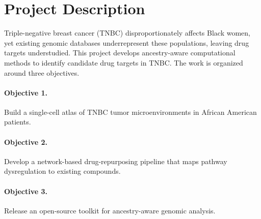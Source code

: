 \documentclass[11pt]{article}
\begin{document}
\section*{Project Description}

Triple-negative breast cancer (TNBC) disproportionately affects Black women, yet
existing genomic databases underrepresent these populations, leaving drug targets
understudied. This project develops ancestry-aware computational methods to identify
candidate drug targets in TNBC. The work is organized around three objectives.

\paragraph{Objective 1.} Build a single-cell atlas of TNBC tumor microenvironments in
African American patients.

\paragraph{Objective 2.} Develop a network-based drug-repurposing pipeline that maps
pathway dysregulation to existing compounds.

\paragraph{Objective 3.} Release an open-source toolkit for ancestry-aware genomic analysis.
\end{document}
